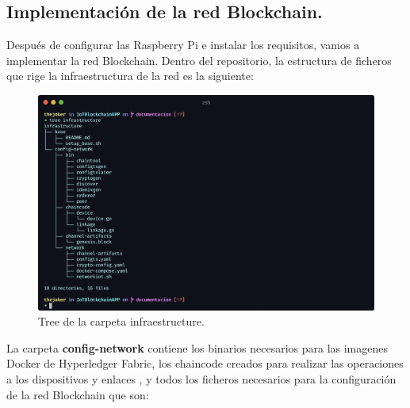 \newpage

\subsection{Implementación de la red Blockchain.}

Después de configurar las Raspberry Pi e instalar los requisitos, vamos a implementar la red Blockchain.
Dentro del repositorio, la estructura de ficheros que rige la infraestructura de la red es la siguiente:

\begin{figure}[ht!]
  \centering
  \includegraphics[width=\textwidth]{imagenes/desarrollo/tree_infraestructure}
  \caption{Tree de la carpeta infraestructure.}
  \label{fig:tree-infraestructure}
\end{figure}

\vspace{5mm}

\noindent La carpeta \textbf{config-network} contiene los binarios necesarios para las imagenes Docker de Hyperledger 
Fabric, los chaincode creados para realizar las operaciones a los dispositivos y enlaces 
\cite{developing-chaincode-nodejs}, y todos los ficheros necesarios para la configuración de la red Blockchain que son: 

